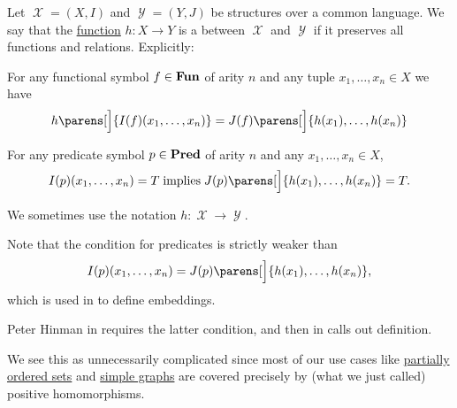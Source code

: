 \begin{definition}\label{def:first_order_homomorphism}
  Let \( \mscrX = (X, I) \) and \( \mscrY = (Y, J) \) be structures over a common language. We say that the \hyperref[def:function]{function} \( h: X \to Y \) is a  between \( \mscrX \) and \( \mscrY \) if it preserves all functions and relations. Explicitly:
  \begin{thmenum}
     For any functional symbol \( f \in \operatorname{\mathbf{Fun}} \) of arity \( n \) and any tuple \( x_1, \ldots, x_n \in X \) we have
    \begin{equation*}
      h\parens[\Big]{ I(f)(x_1, \ldots, x_n) } = J(f) \parens[\Big]{ h(x_1), \ldots, h(x_n) }
    \end{equation*}

     For any predicate symbol \( p \in \operatorname{\mathbf{Pred}} \) of arity \( n \) and any \( x_1, \ldots, x_n \in X \),
    \begin{equation*}
      I(p) (x_1, \ldots, x_n) = T \T{implies} J(p) \parens[\Big]{ h(x_1), \ldots, h(x_n) } = T.
    \end{equation*}
  \end{thmenum}
\end{definition}
\begin{comments}
  \item We sometimes use the notation \( h: \mscrX \to \mscrY \).
  \item Note that the condition  for predicates is strictly weaker than
  \begin{equation*}
    I(p) (x_1, \ldots, x_n) = J(p) \parens[\Big]{ h(x_1), \ldots, h(x_n) },
  \end{equation*}
  which is used in  to define embeddings.

  Peter Hinman in \cite[def. 2.3.26(i)]{Hinman2005} requires the latter condition, and then in \cite[rem. 2.3.27]{Hinman2005} calls  out definition.

  We see this as unnecessarily complicated since most of our use cases like \hyperref[def:partially_ordered_set]{partially ordered sets} and \hyperref[def:quiver/simple]{simple graphs} are covered precisely by (what we just called) positive homomorphisms.
\end{comments}


